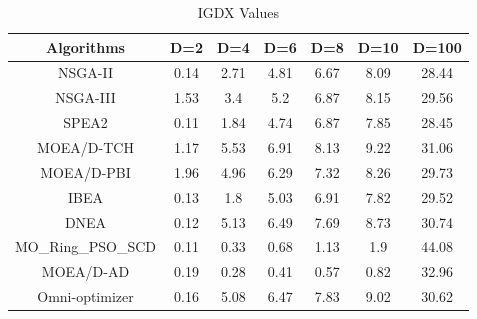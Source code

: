 \documentclass[conference]{IEEEtran}
\begin{document}
\begin{table}[t!]
\centering
\caption{IGDX Values}
\begin{tabular}{@{}ccccccc@{}}
\toprule
Algorithms      & D=2                          & D=4                          & D=6                          & D=8                          & D=10                         & D=100                         \\ \midrule
NSGA-II         & 0.14                         & 2.71                         & 4.81                         & 6.67                         & 8.09                         & 28.44                         \\
NSGA-III        & 1.53                         & 3.4                          & 5.2                          & 6.87                         & 8.15                         & 29.56                         \\
SPEA2           & \cellcolor[HTML]{F8FF00}0.11 & 1.84                         & 4.74                         & 6.87                         & 7.85                         & \cellcolor[HTML]{F8FF00}28.45 \\
MOEA/D-TCH      & 1.17                         & 5.53                         & 6.91                         & 8.13                         & 9.22                          & 31.06                         \\
MOEA/D-PBI      & 1.96                         & 4.96                         & 6.29                         & 7.32                         & 8.26                         & 29.73                         \\
IBEA            & 0.13                         & 1.8                          & 5.03                         & 6.91                         & 7.82                         & 29.52                         \\
DNEA            & 0.12                         & 5.13                         & 6.49                         & 7.69                         & 8.73                         & 30.74                         \\
MO\_Ring\_PSO\_SCD & \cellcolor[HTML]{F8FF00}0.11 & 0.33                         & 0.68                         & 1.13                         & 1.9                          & 44.08                         \\
MOEA/D-AD       & 0.19                         & \cellcolor[HTML]{F8FF00}0.28 & \cellcolor[HTML]{F8FF00}0.41 & \cellcolor[HTML]{F8FF00}0.57 & \cellcolor[HTML]{F8FF00}0.82 & 32.96                         \\
Omni-optimizer  & 0.16                         & 5.08                         & 6.47                         & 7.83                         & 9.02                         & 30.62                         \\ \bottomrule
\end{tabular}
\label{table: IGDX sumup}
\end{table}
\end{document}
